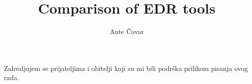 \documentclass[utf8, seminar]{fer}
\title{Comparison of EDR tools}
\author{Ante Čavar}
\renewcommand\thepage{}
\begin{document}
\maketitle
\begin{zahvale}
Zahvaljujem se prijateljima i obitelji koji su mi bili podrška prilikom pisanja ovog rada.
\end{zahvale}
\newpage
\tableofcontents
\newpage
\mainmatter
\setcounter{page}{1}
\renewcommand\thepage{\arabic{page}}
% 
% 
% 
% 
% 
%










\newpage

\begin{sazetak}
\end{sazetak}
\newpage
\begin{abstract}
\end{abstract}


\newpage
\end{document}
